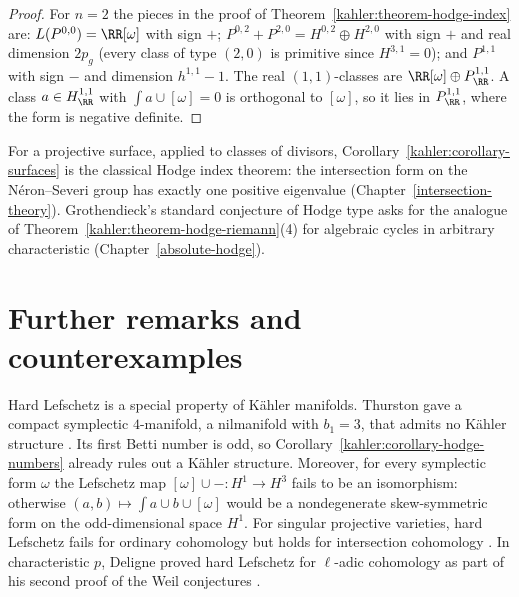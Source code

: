 \begin{proof}
For $n = 2$ the pieces in the proof of Theorem~\ref{kahler:theorem-hodge-index} are: $L(P^{0,0}) = \RR[\omega]$ with sign $+$;
$P^{0,2} + P^{2,0} = H^{0,2} \oplus H^{2,0}$ with sign $+$ and real dimension $2p_g$ (every class of type $(2,0)$ is primitive since
$H^{3,1} = 0$); and $P^{1,1}$ with sign $-$ and dimension $h^{1,1} - 1$. The real $(1,1)$-classes are $\RR[\omega] \oplus P^{1,1}_\RR$. A class
$a \in H^{1,1}_\RR$ with $\int a \cup [\omega] = 0$ is orthogonal to $[\omega]$, so it lies in $P^{1,1}_\RR$, where the form is negative
definite.
\end{proof}

\begin{remark}\label{kahler:remark-hodge-index-divisors}
For a projective surface, applied to classes of divisors, Corollary~\ref{kahler:corollary-surfaces} is the classical Hodge
index theorem: the intersection form on the N\'eron--Severi group has exactly one positive eigenvalue (Chapter~\ref{intersection-theory}).
Grothendieck's standard conjecture of Hodge type asks for the analogue of Theorem~\ref{kahler:theorem-hodge-riemann}(4) for
algebraic cycles in arbitrary characteristic (Chapter~\ref{absolute-hodge}).
\end{remark}

\section{Further remarks and counterexamples}\label{kahler:section-remarks}

\begin{remark}\label{kahler:remark-symplectic}
Hard Lefschetz is a special property of K\"ahler manifolds. Thurston gave a compact symplectic $4$-manifold, a nilmanifold with
$b_1 = 3$, that admits no K\"ahler structure \cite{thurston-1976}. Its first Betti number is odd, so
Corollary~\ref{kahler:corollary-hodge-numbers} already rules out a K\"ahler structure. Moreover, for every symplectic form
$\omega$ the Lefschetz map $[\omega] \cup - \colon H^1 \to H^3$ fails to be an isomorphism: otherwise $(a, b) \mapsto \int a \cup b \cup [\omega]$
would be a nondegenerate skew-symmetric form on the odd-dimensional space $H^1$. For singular projective varieties, hard Lefschetz
fails for ordinary cohomology but holds for intersection cohomology \cite{bbd}. In characteristic $p$, Deligne proved hard Lefschetz for
$\ell$-adic cohomology as part of his second proof of the Weil conjectures \cite{deligne-weil-2}.
\end{remark}


